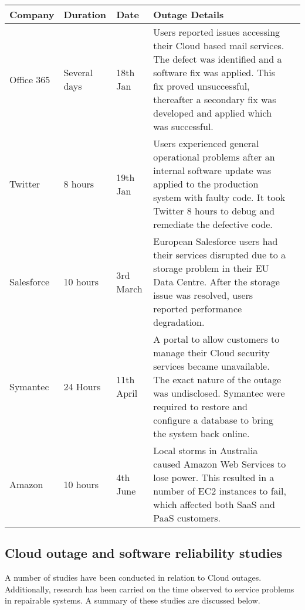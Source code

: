 \documentclass[5p]{elsarticle}
\begin{document}
\begin {table*}[]
\caption {Summary of high profile Cloud outages in the first half of 2016} 
\begin{flushleft}

\begin{tabular}{l | l | l | p{11.4cm} l} \bf {Company} & \bf {Duration} & \bf {Date} & \bf {Outage Details}  
\\ \hline Office 365 & Several days &  18th Jan & Users reported issues accessing their Cloud based mail services. The defect was identified and a software fix was applied. This fix proved unsuccessful, thereafter  a secondary fix was developed and applied which was successful.
\\ \hline Twitter & 8 hours  & 19th Jan & Users experienced general operational problems after an internal software update was applied to the production system with faulty code. It took Twitter 8 hours to debug and remediate the defective code.
\\  \hline Salesforce & 10 hours  &  3rd March &  European Salesforce users had their services disrupted due to a storage problem in their EU Data Centre. After the storage issue was resolved, users reported performance degradation.
\\  \hline Symantec & 24 Hours  &  11th April &  A portal to allow customers to manage their Cloud  security services became unavailable. The exact nature of the outage was undisclosed. Symantec were required to restore and configure a database to bring the system back online.
\\ \hline Amazon & 10 hours  & 4th June & Local storms in Australia caused Amazon Web Services to lose power. This resulted in a number of EC2 instances to fail, which affected both SaaS and PaaS customers. 
\\ \hline 

 \end{tabular}
\end{flushleft}
\end{table*}

\subsection{Cloud outage and software reliability studies}
A number of studies have been conducted in relation to Cloud outages. Additionally, research has been carried on the time observed to service problems in repairable systems.  A summary of these studies are discussed below. \par
\end{document}
